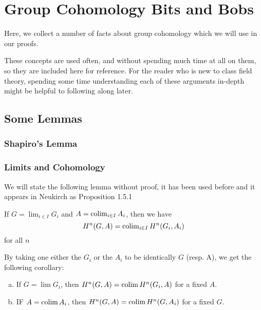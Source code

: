 
\section{Group Cohomology Bits and Bobs}

Here, we collect a number of facts about group cohomology
which we will use in our proofs. 

These concepts are used often, and without spending much
time at all on them, so they are included here for 
reference.
For the reader who is new to class field theory, 
spending some time understanding each of these
arguments in-depth might be helpful to following along later.

\subsection{Some Lemmas}

\subsubsection{Shapiro's Lemma}

\subsubsection{Limits and Cohomology}

We will state the following lemma without proof, it has been used before
and it appears in Neukirch as Proposition 1.5.1

\begin{lemma}
	If \(G = \lim_{i \in I} G_{i}\) and \(A = \operatorname{colim}_{i \in I} A_{i}\),
	then we have 
	\[
		H^{n}(G,A) = \operatorname{colim}_{i \in I} H^{n}(G_{i},A_{i})
	\] 
	for all \(n\)
\end{lemma}

By taking one either the \(G_{i}\) or the \(A_{i}\) to be identically
\(G\) (resp. A), we get the following corollary:

\begin{corollary}\label{cor:lim:cohom}
	\begin{enumerate}[(a)]
		\item If \(G = \lim G_{i}\), then 
			\(H^{n}(G,A) = \operatorname{colim} H^{n}(G_{i},A)\) for a fixed \(A\).
		\item IF \(A = \operatorname{colim} A_{i}\), then 
			\(H^{n}(G,A) = \operatorname{colim} H^{n}(G,A_{i})\) for a fixed \(G\).
	\end{enumerate}
\end{corollary}

